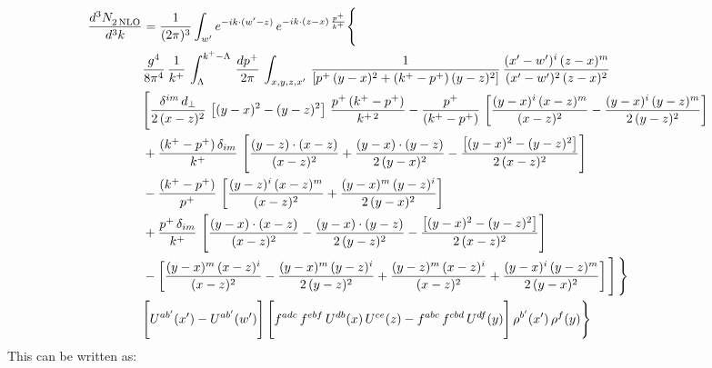 \documentclass[9pt]{article}
\numberwithin{equation}{section}
\begin{document}
\begin{align}
    \frac{d^{3}N_{2\,\rm NLO}^{\rm}}{d^{3}k}  & =  \frac{1}{(2\pi)^{3}}  \int_{ w^\prime} e^{-ik\cdot(w'-z)}\,e^{-ik\cdot (z-x)\,\frac{p^{+}}{k^{+}}} \Bigg\{\notag \\ & \frac{g^{4}}{8\pi^{4}}\,\frac{1}{k^{+}}\,\int_{\Lambda}^{k^{+}-\Lambda}\, \frac{dp^{+}}{2\pi} \, \int_{x,y,z,x'}\,\frac{1}{\left[p^{+}\,(y-x)^{2}+(k^{+}-p^{+})\,(y-z)^{2}\right]}\, \frac{(x'-w')^{i}\,(z-x)^{m}}{(x'-w')^{2}\,(z-x)^{2}} \notag \\ & \Bigg[\frac{\delta^{im}\,d_{\perp}}{2\,(x-z)^{2}}\,\left[(y-x)^{2}-(y-z)^{2}\right]\,\frac{p^{+}\,(k^{+}-p^{+})}{k^{+\,2}}-\frac{p^{+}}{(k^{+}-p^{+})}\,\left[\frac{(y-x)^{i}\,(x-z)^{m}}{(x-z)^{2}}-\frac{(y-x)^{i}\,(y-z)^{m}}{2\,(y-z)^{2}}\right]\notag \\ & +\frac{(k^{+}-p^{+})\,\delta_{im}}{k^{+}}\,\left[\frac{(y-z)\cdot (x-z)}{(x-z)^{2}}+\frac{(y-x)\cdot (y-z)}{2\,(y-x)^{2}}-\frac{\left[(y-x)^{2}-(y-z)^{2}\right]}{2\,(x-z)^{2}}\right]\notag \\ & -\frac{(k^{+}-p^{+})}{p^{+}}\,\left[\frac{(y-z)^{i}\,(x-z)^{m}}{(x-z)^{2}}+\frac{(y-x)^{m}\,(y-z)^{i}}{2\,(y-x)^{2}}\right]\notag \\ & +\frac{p^{+}\,\delta_{im}}{k^{+}}\,\left[\frac{(y-x)\cdot (x-z)}{(x-z)^{2}}-\frac{(y-x)\cdot (y-z)}{2\,(y-z)^{2}}-\frac{\left[(y-x)^{2}-(y-z)^{2}\right]}{2\,(x-z)^{2}}\right]\notag \\ &-\left[\frac{(y-x)^{m}\,(x-z)^{i}}{(x-z)^{2}}-\frac{(y-x)^{m}\,(y-z)^{i}}{2\,(y-z)^{2}}+\frac{(y-z)^{m}\,(x-z)^{i}}{(x-z)^{2}}+\frac{(y-x)^{i}\,(y-z)^{m}}{2\,(y-x)^{2}}\right]\Bigg]\,\Bigg\} \notag \\ & \Bigg[U^{ab'}(x')-U^{ab'}(w')\Bigg]\,\Bigg[f^{adc}\,f^{ebf}\,U^{db}(x)\,U^{ce}(z)-f^{abc}\,f^{cbd}\,U^{df}(y)\Bigg]\,\rho^{b'}(x')\,\rho^{f}(y)\Bigg\}
\end{align}
This can be written as: 
\end{document}
